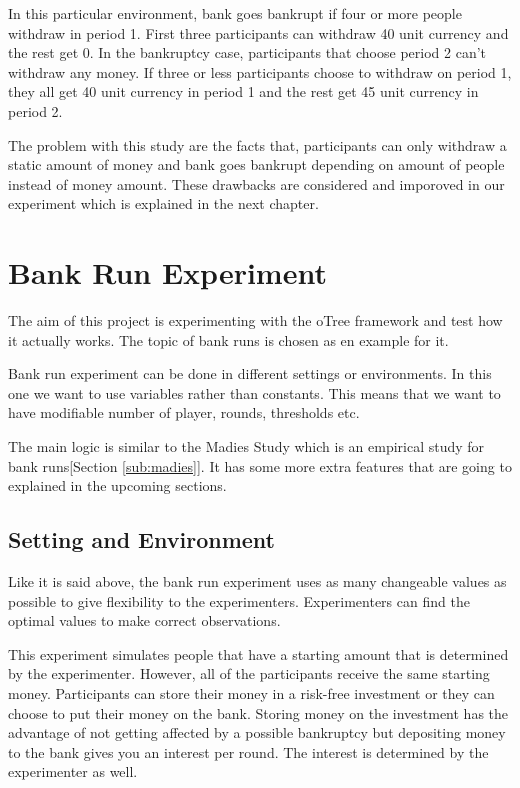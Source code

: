 In this particular environment, bank goes bankrupt if four or more people withdraw in period 1. First three participants can withdraw 40 unit currency and the rest get 0. In the bankruptcy case, participants that choose period 2 can't withdraw any money. If three or less participants choose to withdraw on period 1, they all get 40 unit currency in period 1 and the rest get 45 unit currency in period 2.

The problem with this study are the facts that, participants can only withdraw a static amount of money and bank goes bankrupt depending on amount of people instead of  money amount. These drawbacks are considered and imporoved in our experiment which is explained in the next chapter.

\chapter{Bank Run Experiment} \label{cha:bankRunExperiment}

The aim of this project is experimenting with the oTree framework and test how it actually works. The topic of bank runs is chosen as en example for it. 

Bank run experiment can be done in different settings or environments. In this one we want to use variables rather than constants. This means that we want to have modifiable number of player, rounds, thresholds etc. 

The main logic is similar to the Madies Study which is an empirical study for bank runs[Section \ref{sub:madies}]. It has some more extra features that are going to explained in the upcoming sections.

\section{Setting and Environment}\label{sec:setting}

Like it is said above, the bank run experiment uses as many changeable values as possible to give flexibility to the experimenters. Experimenters can find the optimal values to make correct observations. 

This experiment simulates people that have a starting amount that is determined by the experimenter. However, all of the participants receive the same starting money. Participants can store their money in a risk-free investment or they can choose to put their money on the bank. Storing money on the investment has the advantage of not getting affected by a possible bankruptcy but depositing money to the bank gives you an interest per round. The interest is determined by the experimenter as well. 

